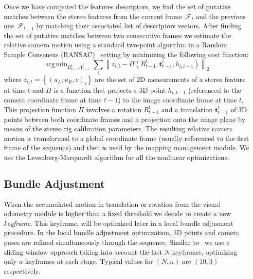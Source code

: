 \documentclass[conference]{IEEEtran}
\DeclareMathOperator*{\argmin}{arg\,min}
\begin{document}
Once we have computed the features descriptors, we find the set of putative matches between the stereo features from the current frame~$\mathcal{F}_{t}$ and the previous one~$\mathcal{F}_{t-1}$ by matching their associated list of descriptors vectors. After finding the set of putative matches between two consecutive frames we estimate the relative camera motion using a standard two-point algorithm in a Random Sample Consensus (RANSAC)~\cite{Bolles81ijcai} setting by minimizing the following cost function:
%
\begin{equation} \label{eq:three_pt}
\argmin_{\textit{R}_{t-1}^{t},\mathbf{t}_{t-1}^{t}} \sum\limits_{i} \left\| z_{i,t} - \Pi\left(\textit{R}_{t-1}^{t},\mathbf{t}_{t-1}^{t},h_{i,t-1}\right)\right\|_{2}
\end{equation}
%
where $z_{i,t}=\left\{\left(u_{L},u_{R},v\right)_{i}\right\}$ are the set of 2D measurements of a stereo feature at time t and $\Pi$ is a function that projects a 3D point $h_{i,t-1}$ (referenced to the camera coordinate frame at time $t-1$) to the image coordinate frame at time $t$. This projection function $\Pi$ involves a rotation $\textit{R}_{t-1}^{t}$ and a translation $\mathbf{t}_{t-1}^{t}$ of 3D points between both coordinate frames and a projection onto the image plane by means of the stereo rig calibration
parameters. The resulting relative camera motion is transformed to a global coordinate frame (usually referenced to the first frame of the sequence) and then is used by the mapping management module. We use the
Levenberg-Marquardt algorithm for all the nonlinear optimizations.

\subsection{Bundle Adjustment}\label{sec:ba}
When the accumulated motion in translation or rotation from the visual odometry module is higher than a fixed threshold we decide to create a new \textit{keyframe}. This keyframe, will be optimized later in a local bundle adjusment procedure. In the local bundle adjustment optimization, 3D points and camera poses are refined simultaneously through the sequence. Similar to~\cite{Mouragnon09ivc} we use a sliding window approach taking into account the last $N$ keyframes, optimizing only $n$ keyframes at each stage. Typical values for $\left(N,n\right)$ are $\left(10,3\right)$ respectively.
\end{document}
